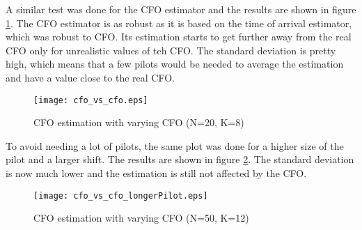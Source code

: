 A similar test was done for the CFO estimator and the results are shown in figure \ref{fig:CFO_std_CFO}. The CFO estimator is as robust as it is based on the time of arrival estimator, which was robust to CFO. Its estimation starts to get further away from the real CFO only for unrealistic values of teh CFO. The standard deviation is pretty high, which means that a few pilots would be needed to average the estimation and have a value close to the real CFO. \par

\begin{figure}[H]
    \centering
    \texttt{[image: cfo\_vs\_cfo.eps]}
    \caption{CFO estimation with varying CFO (N=20, K=8)}
    \label{fig:CFO_std_CFO}
\end{figure}

To avoid needing a lot of pilots, the same plot was done for a higher size of the pilot and a larger shift. The results are shown in figure \ref{fig:CFO_std_CFO_N}. The standard deviation is now much lower and the estimation is still not affected by the CFO. \par

\begin{figure}[H]
    \centering
    \texttt{[image: cfo\_vs\_cfo\_longerPilot.eps]}
    \caption{CFO estimation with varying CFO (N=50, K=12)}
    \label{fig:CFO_std_CFO_N}
\end{figure}
